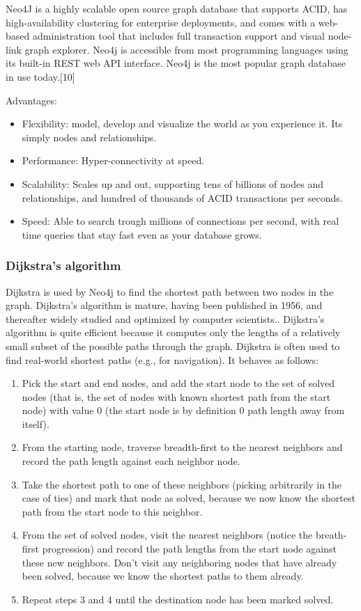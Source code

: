 Neo4J is a highly scalable open source graph database that supports ACID, has high-availability clustering for enterprise deployments, and comes with a web-based administration tool that includes full transaction support and visual node-link graph explorer. Neo4j is accessible from most programming languages using its built-in REST web API interface. Neo4j is the most popular graph database in use today.[10]

Advantages:
\begin{itemize} 
\item Flexibility: model, develop and visualize the world as you experience it. Its simply nodes and relationships. 
\item Performance: Hyper-connectivity at speed. 
\item Scalability: Scales up and out, supporting tens of billions of nodes and relationships, and hundred of thousands of ACID transactions per seconds. 
\item Speed: Able to search trough millions of connections per second, with real time queries that stay fast even as your database grows. 
\end{itemize}

\subsubsection{Dijkstra's algorithm}
Dijkstra  is used  by Neo4j to find the shortest path between two nodes in the graph. Dijkstra’s algorithm is mature, having been published in 1956, and thereafter widely studied and optimized by computer scientists.\citep{neo13}. Dijkstra’s algorithm is quite efficient because it computes only the lengths of a relatively small subset of the possible paths through the graph. Dijkstra is often used to find real-world shortest paths (e.g., for navigation). It behaves as follows:
\begin{enumerate}
\item Pick the start and end nodes, and add the start node to the set of solved nodes (that is, the set of nodes with known shortest path from the start node) with value 0 (the start node is by definition 0 path length away from itself).
\item From the starting node, traverse breadth-first to the nearest neighbors and record the path length against each neighbor node.
\item Take the shortest path to one of these neighbors (picking arbitrarily in the case of ties) and mark that node as solved, because we now know the shortest path from the start node to this neighbor.
\item From the set of solved nodes, visit the nearest neighbors (notice the breath-first progression) and record the path lengths from the start node against these new neighbors. Don’t visit any neighboring nodes that have already been solved, because we know the shortest paths to them already.
\item Repeat steps 3 and 4 until the destination node has been marked solved.
\end{enumerate}



